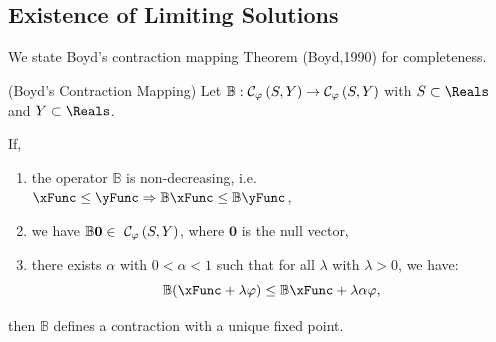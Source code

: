 \documentclass[\econtexRoot/BufferStockTheory]{subfiles}
\begin{document}
\hypertarget{It-Is-A-Contraction-Mapping}{}
\subsection{Existence of Limiting Solutions}\label{sec:Tcontractionmapping}



We state Boyd's contraction mapping Theorem (Boyd,1990) for completeness.

\begin{theorem}(Boyd's Contraction Mapping)\label{thm:Boyd}
Let $\mathbb{B}:\mathcal{C}_{\varphi }\left( S,Y\right)
  \rightarrow \mathcal{C}_{\varphi }\left(S,Y\right) $ with $S\subset \Reals$ and $Y\subset \Reals$.

If, 
\begin{enumerate}
  \item the operator $\mathbb{B}$ is non-decreasing, i.e.\ $\xFunc \leq \yFunc \Rightarrow\mathbb{B}{\xFunc } \leq \mathbb{B}{\yFunc}$,
  \item we have $\mathbb{B}\mathbf{0}\in ~ \mathcal{C}_{\varphi }\left(S,Y\right) $, where $\mathbf{0}$ is the null vector,
  \item there exists $\alpha$ with $0 < \alpha < 1$ such that for all $\lambda$ with $\lambda > 0$, we have:
             $$\mathbb{B}({\xFunc } +\lambda\boundFunc ) \leq \mathbb{B}{\xFunc } +\lambda\alpha \boundFunc,$$
\end{enumerate}
then $\mathbb{B}$ defines a contraction with a unique fixed point.
\end{theorem}
\end{document}
